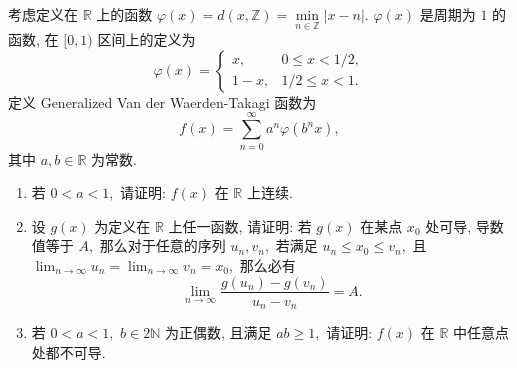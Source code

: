 \begin{question}[points = 12]
考虑定义在 $\mathbb{R}$ 上的函数 $\varphi(x) = d(x, \mathbb{Z}) = \min\limits_{n \in \mathbb{Z}} |x - n|.$ $\varphi(x)$ 是周期为 $1$ 的函数, 在 $[0, 1)$ 区间上的定义为
\[
\varphi(x) = \begin{cases}
x, & 0 \leqslant x < 1/2, \\ 1 - x, & 1/2 \leqslant x < 1.
\end{cases}
\]
定义 Generalized Van der Waerden-Takagi 函数为
\[
f(x) = \sum_{n=0}^{\infty} a^n \varphi(b^n x),
\]
其中 $a,b \in \mathbb{R}$ 为常数.
\begin{enumerate}
\item 若 $0 < a < 1,$ 请证明: $f(x)$ 在 $\mathbb{R}$ 上连续.
\item 设 $g(x)$ 为定义在 $\mathbb{R}$ 上任一函数, 请证明: 若 $g(x)$ 在某点 $x_0$ 处可导, 导数值等于 $A,$ 那么对于任意的序列 $u_n, v_n,$ 若满足 $u_n \leqslant x_0 \leqslant v_n,$ 且 $\displaystyle \lim_{n\to\infty} u_n = \lim_{n\to\infty} v_n = x_0,$ 那么必有
\[
\lim_{n\to\infty} \dfrac{g(u_n) - g(v_n)}{u_n - v_n} = A.
\]
\item 若 $0 < a < 1,$ $b \in 2 \mathbb{N}$ 为正偶数, 且满足 $ab \geqslant 1,$ 请证明: $f(x)$ 在 $\mathbb{R}$ 中任意点处都不可导.
\end{enumerate}

\end{question}

